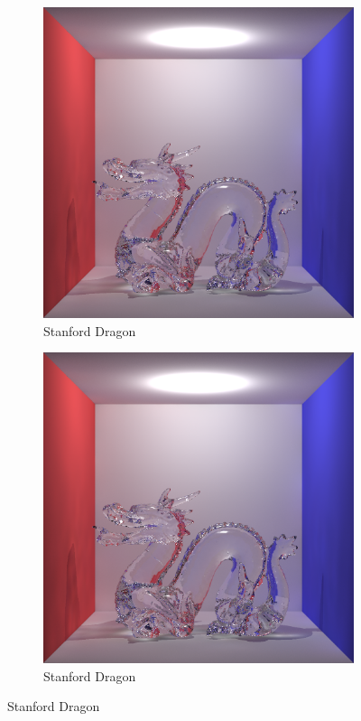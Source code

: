 \begin{figure}
\centering
	\begin{subfigure}[b]{0.6\textwidth}
	\includegraphics[width=\textwidth]{./images/renders/dragon.png}
	\caption{Stanford Dragon}
	\end{subfigure}

	\begin{subfigure}[b]{0.6\textwidth}
	\includegraphics[width=\textwidth]{./images/renders/dragon.png}
	\caption{Stanford Dragon}
	\end{subfigure}
\end{figure}

